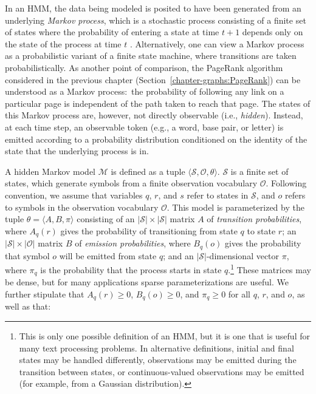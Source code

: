 In an HMM, the data being modeled is posited to have been generated
from an underlying \emph{Markov process}, which is a stochastic
process consisting of a finite set of states where the probability of
entering a state at time $t+1$ depends only on the state of the
process at time $t$ \cite{Ross_1996}.  Alternatively, one can view a
Markov process as a probabilistic variant of a finite state machine,
where transitions are taken probabilistically.  As another point of
comparison, the PageRank algorithm considered in the previous chapter
(Section~\ref{chapter-graphs:PageRank}) can be understood as a Markov
process:\ the probability of following any link on a particular page
is independent of the path taken to reach that page.  The states of
this Markov process are, however, not directly observable (i.e., {\it
  hidden}).  Instead, at each time step, an observable token (e.g., a
word, base pair, or letter) is emitted according to a probability
distribution conditioned on the identity of the state that the
underlying process is in.

A hidden Markov model $\mathcal{M}$ is defined as a tuple $\langle
\mathcal{S} , \mathcal{O}, \theta \rangle$.  $\mathcal{S}$ is a finite
set of states, which generate symbols from a finite observation
vocabulary $\mathcal{O}$.  Following convention, we assume that
variables $q$, $r$, and $s$ refer to states in $\mathcal{S}$, and $o$
refers to symbols in the observation vocabulary $\mathcal{O}$. This
model is parameterized by the tuple $\theta=\langle A, B, \pi \rangle$
consisting of an $|\mathcal{S}| \times |\mathcal{S}|$ matrix $A$ of
\emph{transition probabilities}, where $A_{q}(r)$ gives the
probability of transitioning from state $q$ to state $r$; an
$|\mathcal{S}| \times |\mathcal{O}|$ matrix $B$ of \emph{emission
  probabilities}, where $B_{q}(o)$ gives the probability that symbol
$o$ will be emitted from state $q$; and an $|\mathcal{S}|$-dimensional
vector $\pi$, where $\pi_q$ is the probability that the process starts
in state $q$.\footnote{This is only one possible definition of an HMM,
  but it is one that is useful for many text processing problems.  In
  alternative definitions, initial and final states may be handled
  differently, observations may be emitted during the transition
  between states, or continuous-valued observations may be emitted
  (for example, from a Gaussian distribution).}  These matrices may be
dense, but for many applications sparse parameterizations are useful.
We further stipulate that $A_{q}(r) \ge 0$, $B_q(o) \ge 0$, and $\pi_q
\ge 0$ for all $q$, $r$, and $o$, as well as that:

